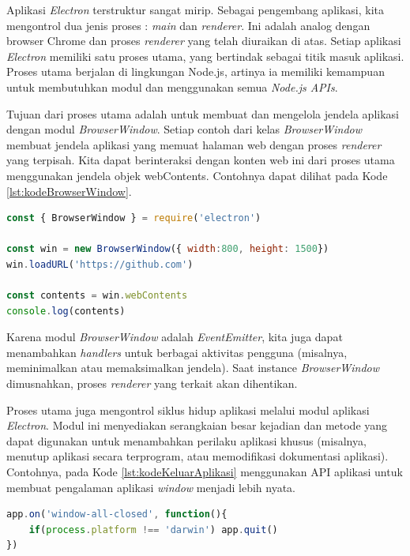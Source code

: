 Aplikasi \textit{Electron} terstruktur sangat mirip. Sebagai pengembang aplikasi, kita mengontrol dua jenis proses : \textit{main} dan \textit{renderer}. Ini adalah analog dengan browser Chrome dan proses \textit{renderer} yang telah diuraikan di atas. Setiap aplikasi \textit{Electron} memiliki satu proses utama, yang bertindak sebagai titik masuk aplikasi. Proses utama berjalan di lingkungan Node.js, artinya ia memiliki kemampuan untuk membutuhkan modul dan menggunakan semua \textit{Node.js APIs}.

Tujuan dari proses utama adalah untuk membuat dan mengelola jendela aplikasi dengan modul \textit{BrowserWindow}. Setiap contoh dari kelas \textit{BrowserWindow} membuat jendela aplikasi yang memuat halaman web dengan proses \textit{renderer} yang terpisah. Kita dapat berinteraksi dengan konten web ini dari proses utama menggunakan  jendela objek webContents. Contohnya dapat dilihat pada Kode \ref{lst:kodeBrowserWindow}.

\begin{lstlisting}[language=JavaScript, caption=Contoh kode penggunaan BrowserWindow\label{lst:kodeBrowserWindow}]
const { BrowserWindow } = require('electron')

const win = new BrowserWindow({ width:800, height: 1500})
win.loadURL('https://github.com')

const contents = win.webContents
console.log(contents)
\end{lstlisting}


Karena modul \textit{BrowserWindow} adalah \textit{EventEmitter}, kita juga dapat menambahkan \textit{handlers} untuk berbagai aktivitas pengguna (misalnya, meminimalkan atau memaksimalkan jendela). Saat instance \textit{BrowserWindow} dimusnahkan, proses \textit{renderer} yang terkait akan dihentikan.

Proses utama juga mengontrol siklus hidup aplikasi melalui modul aplikasi \textit{Electron}. Modul ini menyediakan serangkaian besar kejadian dan metode yang dapat digunakan untuk menambahkan perilaku aplikasi khusus (misalnya, menutup aplikasi secara terprogram, atau memodifikasi dokumentasi aplikasi). Contohnya, pada Kode \ref{lst:kodeKeluarAplikasi} menggunakan API aplikasi untuk membuat pengalaman aplikasi \textit{window} menjadi lebih nyata.

\begin{lstlisting}[language=JavaScript, caption=Contoh kode untuk keluar dari aplikasi\label{lst:kodeKeluarAplikasi}]
app.on('window-all-closed', function(){
    if(process.platform !== 'darwin') app.quit()
})
\end{lstlisting}

